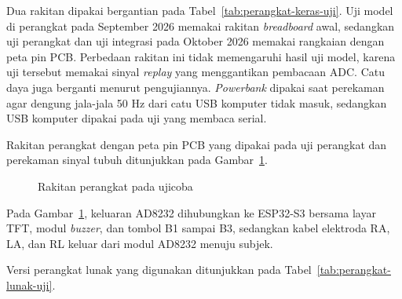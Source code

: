 Dua rakitan dipakai bergantian pada Tabel~\ref{tab:perangkat-keras-uji}. Uji model di perangkat pada September 2026 memakai rakitan \textit{breadboard} awal, sedangkan uji perangkat dan uji integrasi pada Oktober 2026 memakai rangkaian dengan peta pin PCB. Perbedaan rakitan ini tidak memengaruhi hasil uji model, karena uji tersebut memakai sinyal \textit{replay} yang menggantikan pembacaan ADC. Catu daya juga berganti menurut pengujiannya. \textit{Powerbank} dipakai saat perekaman agar dengung jala-jala 50 Hz dari catu USB komputer tidak masuk, sedangkan USB komputer dipakai pada uji yang membaca serial.

Rakitan perangkat dengan peta pin PCB yang dipakai pada uji perangkat dan perekaman sinyal tubuh ditunjukkan pada Gambar~\ref{fig:4-foto-rakitan}.

\begin{figure}[!ht]
  \centering
  \caption{Rakitan perangkat pada ujicoba}
  \label{fig:4-foto-rakitan}
\end{figure}

Pada Gambar~\ref{fig:4-foto-rakitan}, keluaran AD8232 dihubungkan ke ESP32-S3 bersama layar TFT, modul \textit{buzzer}, dan tombol B1 sampai B3, sedangkan kabel elektroda RA, LA, dan RL keluar dari modul AD8232 menuju subjek.

Versi perangkat lunak yang digunakan ditunjukkan pada Tabel~\ref{tab:perangkat-lunak-uji}.

